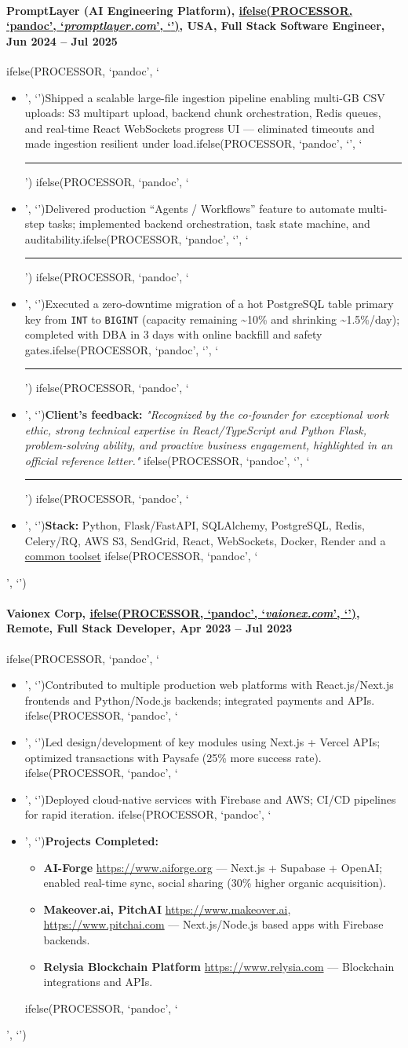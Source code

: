 \documentclass[a4paper,11pt]{article}
\newcommand{\chref}[2]{\href{#1}
{ifelse(PROCESSOR, `pandoc', `#2', `\underline{\smash{#2}}')}}
\newcommand{\itchref}[2]{\chref{#1}{\textit{#2}}}  %
\newcommand{\nesteditemize}[1]{%
    \vspace{2pt}%
    \begin{itemize}%
        \setlength{\itemsep}{2pt}%
        #1%
      \end{itemize}%
    }
\newcommand{\chrule}{ifelse(PROCESSOR, `pandoc', `', `\vspace{3pt}\hrule')}
\newcommand{\pdbeginitemize}{ifelse(PROCESSOR, `pandoc', `\begin{itemize}', `')}
\newcommand{\pditem}{ifelse(PROCESSOR, `pandoc', `\item', `')}
\newcommand{\pdenditemize}{ifelse(PROCESSOR, `pandoc', `\end{itemize}', `')}
\begin{document}
\paragraph*{PromptLayer (AI Engineering Platform), \itchref{https://promptlayer.com}{promptlayer.com}, USA, Full Stack Software Engineer, Jun 2024 -- Jul 2025}
\pdbeginitemize
\pditem Shipped a scalable large-file ingestion pipeline enabling multi-GB CSV uploads: S3 multipart upload, backend chunk orchestration, Redis queues, and real-time React WebSockets progress UI — eliminated timeouts and made ingestion resilient under load.\chrule
\pditem Delivered production “Agents / Workflows” feature to automate multi-step tasks; implemented backend orchestration, task state machine, and auditability.\chrule
\pditem Executed a zero-downtime migration of a hot PostgreSQL table primary key from \texttt{INT} to \texttt{BIGINT} (capacity remaining \textasciitilde10\% and shrinking \textasciitilde1.5\%/day); completed with DBA in 3 days with online backfill and safety gates.\chrule
\pditem \textbf{Client's feedback:} \textit{"Recognized by the co-founder for exceptional work ethic, strong technical expertise in React/TypeScript and Python Flask, problem-solving ability, and proactive business engagement, highlighted in an official reference letter."}
\chrule
\pditem \textbf{Stack:} Python, Flask/FastAPI, SQLAlchemy, PostgreSQL, Redis, Celery/RQ, AWS S3, SendGrid, React, WebSockets, Docker, Render and a \hyperlink{common-toolset}{common toolset}
\pdenditemize

\paragraph*{Vaionex Corp, \itchref{https://vaionex.com}{vaionex.com}, Remote, Full Stack Developer, Apr 2023 -- Jul 2023}
\pdbeginitemize
\pditem Contributed to multiple production web platforms with React.js/Next.js frontends and Python/Node.js backends; integrated payments and APIs.
\pditem Led design/development of key modules using Next.js + Vercel APIs; optimized transactions with Paysafe (25\% more success rate).
\pditem Deployed cloud-native services with Firebase and AWS; CI/CD pipelines for rapid iteration.
\pditem \textbf{Projects Completed:}
    \nesteditemize{
        \item \textbf{AI-Forge} \url{https://www.aiforge.org} — Next.js + Supabase + OpenAI; enabled real-time sync, social sharing (30\% higher organic acquisition).
        \item \textbf{Makeover.ai, PitchAI} \url{https://www.makeover.ai}, \url{https://www.pitchai.com} — Next.js/Node.js based apps with Firebase backends.
        \item \textbf{Relysia Blockchain Platform} \url{https://www.relysia.com} — Blockchain integrations and APIs.
    }
\pdenditemize
\end{document}
